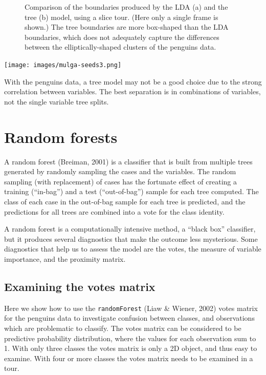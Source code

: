 \documentclass[
  letterpaper,
]{krantz}
\newcommand{\insightbox}[1]{%
\noindent\colorbox{insight!30}{%
\begin{minipage}{0.98\textwidth}%
    \centering%
    \begin{minipage}[c]{0.15\textwidth} %
      \texttt{[image: images/mulga-seeds3.png]} %
    \end{minipage}%
    \hfill %
    \begin{minipage}[c]{0.8\textwidth} %
      \bigskip%
      \textsf{#1}%
      \bigskip%
    \end{minipage}%
    \hspace*{3mm}%
  \end{minipage}%
}%
}
\begin{document}
\begin{figure}
\begin{minipage}[t]{0.50\linewidth}
{{}

}

\end{minipage}%

\caption{\label{fig-penguins-lda-tree-pdf}Comparison of the boundaries
produced by the LDA (a) and the tree (b) model, using a slice tour.
(Here only a single frame is shown.) The tree boundaries are more
box-shaped than the LDA boundaries, which does not adequately capture
the differences between the elliptically-shaped clusters of the penguins
data.}

\end{figure}

\insightbox{With the penguins data, a tree model may not be a good choice due to the strong correlation between variables. The best separation is in combinations of variables, not the single variable tree splits.}

\hypertarget{random-forests}{%
\section{Random forests}\label{random-forests}}


A random forest (Breiman, 2001) is a classifier that is built from
multiple trees generated by randomly sampling the cases and the
variables. The random sampling (with replacement) of cases has the
fortunate effect of creating a training (``in-bag'') and a test
(``out-of-bag'') sample for each tree computed. The class of each case
in the out-of-bag sample for each tree is predicted, and the predictions
for all trees are combined into a vote for the class identity.

A random forest is a computationally intensive method, a ``black box''
classifier, but it produces several diagnostics that make the outcome
less mysterious. Some diagnostics that help us to assess the model are
the votes, the measure of variable importance, and the proximity matrix.

\hypertarget{examining-the-votes-matrix}{%
\subsection{Examining the votes
matrix}\label{examining-the-votes-matrix}}

Here we show how to use the \texttt{randomForest} (Liaw \& Wiener, 2002)
votes matrix for the penguins data to investigate confusion between
classes, and observations which are problematic to classify. The votes
matrix can be considered to be predictive probability distribution,
where the values for each observation sum to 1. With only three classes
the votes matrix is only a 2D object, and thus easy to examine. With
four or more classes the votes matrix needs to be examined in a tour.
\end{document}
